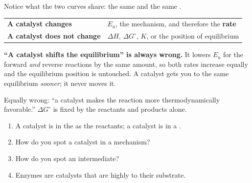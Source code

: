 \documentclass{apchem-notes}
\begin{document}
Notice what the two curves share: the same
 and the same .

\begin{center}
\begin{tabular}{@{}ll@{}}
\hline
\textbf{A catalyst changes} & $E_a$, the mechanism, and therefore the
  \textbf{rate} \\
\textbf{A catalyst does not change} & $\Delta H$, $\Delta G^\circ$, $K$, or
  the position of equilibrium \\
\hline
\end{tabular}
\end{center}

\begin{apctrap}
\textbf{``A catalyst shifts the equilibrium'' is always wrong.} It lowers
$E_a$ for the forward \emph{and} reverse reactions by the same amount, so
both rates increase equally and the equilibrium position is untouched. A
catalyst gets you to the same equilibrium \emph{sooner}; it never moves it.

Equally wrong: ``a catalyst makes the reaction more thermodynamically
favorable.'' $\Delta G^\circ$ is fixed by the reactants and products alone.
\end{apctrap}


\begin{enumerate}[leftmargin=*,itemsep=0.35em]
  \item A  catalyst is in the
         as the reactants; a
         catalyst is in a
        .
  \item How do you spot a catalyst in a mechanism?
  \item How do you spot an intermediate?
  \item Enzymes are catalysts that are highly
         to their substrate.
\end{enumerate}

\end{document}
